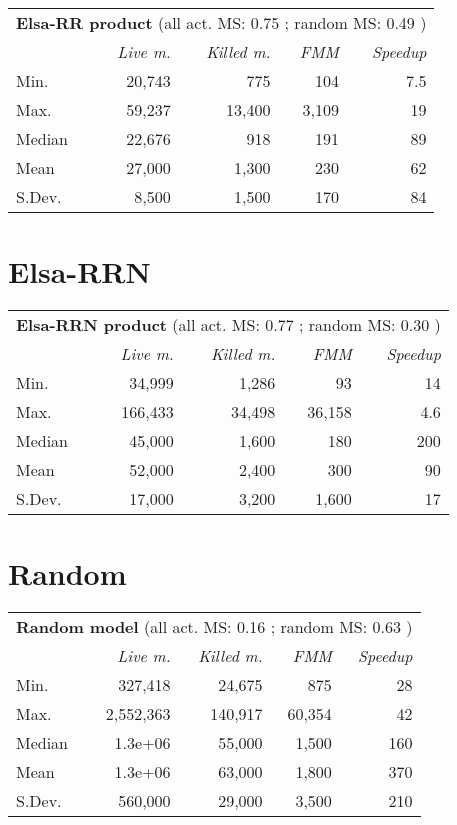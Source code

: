 \begin{tabularx}{90mm}{X rrrr}
\hline	\multicolumn{5}{c}{ \textbf{Elsa-RR  product} (all act. MS: 0.75 ; random MS: 0.49 )}	\\
	& \textit{Live m.}	& \textit{Killed m.} & \textit{FMM}& \textit{Speedup}\\
\hline Min. &  20,743   &  775   &  104    & 7.5 \\
Max. &  59,237   &  13,400   &  3,109    & 19 \\
Median			&  22,676   &  918   &  191    & 89 \\
Mean			&  27,000   &  1,300   &  230  & 62 \\
S.Dev.	&  8,500   &  1,500  &  170   &  84 \\
\hline
\end{tabularx}
%


\section{Elsa-RRN}

\begin{tabularx}{90mm}{X rrrr}
\hline	\multicolumn{5}{c}{ \textbf{Elsa-RRN  product} (all act. MS: 0.77 ; random MS: 0.30 )}	\\
	& \textit{Live m.}	& \textit{Killed m.} & \textit{FMM}& \textit{Speedup}\\
\hline Min. &  34,999   &  1,286   &  93    & 14 \\
Max. &  166,433   &  34,498   &  36,158    & 4.6 \\
Median			&  45,000   &  1,600   &  180    & 200 \\
Mean			&  52,000   &  2,400   &  300  & 90 \\
S.Dev.	&  17,000   &  3,200  &  1,600   &  17 \\
\hline
\end{tabularx}
%


\section{Random}

\begin{tabularx}{90mm}{X rrrr}
\hline	\multicolumn{5}{c}{ \textbf{Random model} (all act. MS: 0.16 ; random MS: 0.63 )}	\\
	& \textit{Live m.}	& \textit{Killed m.} & \textit{FMM}& \textit{Speedup}\\
\hline Min. &  327,418   &  24,675   &  875    & 28 \\
Max. &  2,552,363   &  140,917   &  60,354    & 42 \\
Median			&  1.3e+06   &  55,000   &  1,500    & 160 \\
Mean			&  1.3e+06   &  63,000   &  1,800  & 370 \\
S.Dev.	&  560,000   &  29,000  &  3,500   &  210 \\
\hline
\end{tabularx}
%

